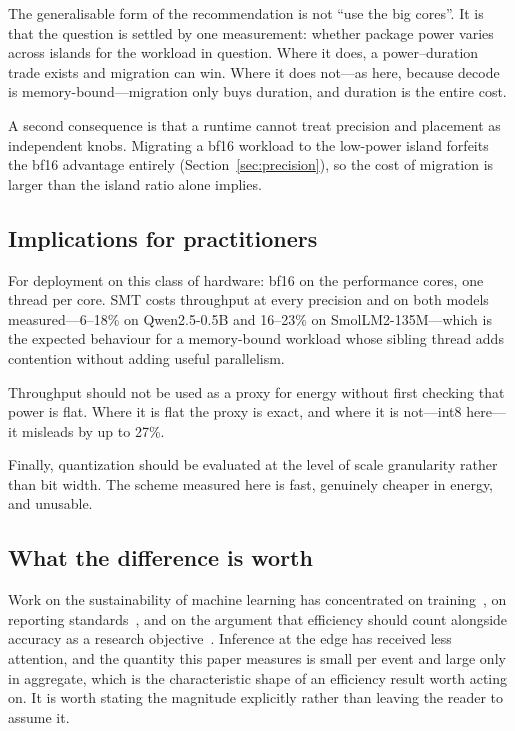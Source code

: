 \documentclass[journal]{IEEEtran}
\begin{document}
The generalisable form of the recommendation is not ``use the big cores''. It
is that the question is settled by one measurement: whether package power
varies across islands for the workload in question. Where it does, a
power--duration trade exists and migration can win. Where it does not---as here,
because decode is memory-bound---migration only buys duration, and duration is
the entire cost.

A second consequence is that a runtime cannot treat precision and placement as
independent knobs. Migrating a bf16 workload to the low-power island forfeits
the bf16 advantage entirely (Section~\ref{sec:precision}), so the cost of
migration is larger than the island ratio alone implies.

\subsection{Implications for practitioners}
For deployment on this class of hardware: bf16 on the performance cores, one
thread per core. SMT costs throughput at every precision and on both models
measured---6--18\% on Qwen2.5-0.5B and 16--23\% on SmolLM2-135M---which is the
expected behaviour for a memory-bound workload whose sibling thread adds
contention without adding useful parallelism.

Throughput should not be used as a proxy for energy without first checking that
power is flat. Where it is flat the proxy is exact, and where it is not---int8
here---it misleads by up to 27\%.

Finally, quantization should be evaluated at the level of scale granularity
rather than bit width. The scheme measured here is fast, genuinely cheaper in
energy, and unusable.

\subsection{What the difference is worth}
\label{sec:sustainability}
Work on the sustainability of machine learning has concentrated on
training~\cite{strubell2019energy,patterson2021carbon}, on reporting
standards~\cite{henderson2020reporting}, and on the argument that efficiency
should count alongside accuracy as a research
objective~\cite{schwartz2020greenai}. Inference at the edge has received less
attention, and the quantity this paper measures is small per event and large
only in aggregate, which is the characteristic shape of an efficiency result
worth acting on. It is worth stating the magnitude explicitly rather than leaving the
reader to assume it.
\end{document}
